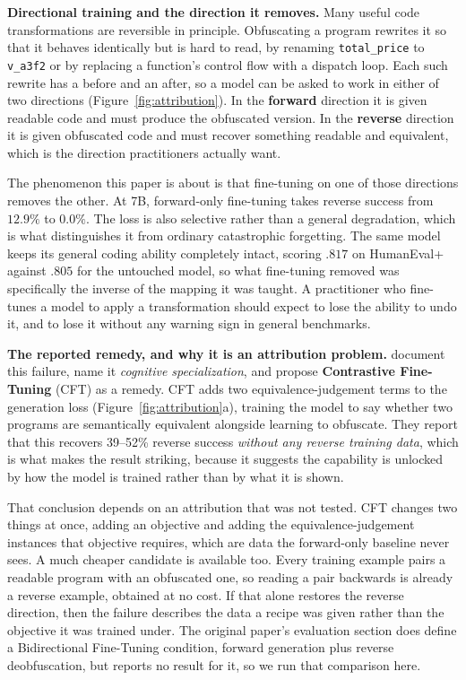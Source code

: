 \documentclass{article}
\begin{document}
\textbf{Directional training and the direction it removes.} Many useful code
transformations are reversible in principle. Obfuscating a program rewrites it so that it
behaves identically but is hard to read, by renaming \texttt{total\_price} to
\texttt{v\_a3f2} or by replacing a function's control flow with a dispatch loop. Each such
rewrite has a before and an after, so a model can be asked to work in either of two
directions (Figure~\ref{fig:attribution}). In the \textbf{forward} direction it is given
readable code and must produce the obfuscated version. In the \textbf{reverse} direction it
is given obfuscated code and must recover something readable and equivalent, which is the
direction practitioners actually want.



The phenomenon this paper is about is that fine-tuning on one of those directions removes
the other. At 7B, forward-only fine-tuning takes reverse success from $12.9\%$ to $0.0\%$.
The loss is also selective rather than a general degradation, which is what distinguishes it
from ordinary catastrophic forgetting. The same model keeps its general coding ability
completely intact, scoring $.817$ on HumanEval+ against $.805$ for the untouched model, so
what fine-tuning removed was specifically the inverse of the mapping it was taught. A
practitioner who fine-tunes a model to apply a transformation should expect to lose the
ability to undo it, and to lose it without any warning sign in general benchmarks.

\textbf{The reported remedy, and why it is an attribution problem.}
\citet{nikiema2025contrastive} document this failure, name it \emph{cognitive
specialization}, and propose \textbf{Contrastive Fine-Tuning} (CFT) as a remedy. CFT adds two
equivalence-judgement terms to the generation loss (Figure~\ref{fig:attribution}a), training
the model to say whether two programs are semantically equivalent alongside learning to
obfuscate. They report that this recovers 39--52\% reverse success \emph{without any reverse
training data}, which is what makes the result striking, because it suggests the capability is
unlocked by how the model is trained rather than by what it is shown.

That conclusion depends on an attribution that was not tested. CFT changes two things at
once, adding an objective and adding the equivalence-judgement instances that objective
requires, which are data the forward-only baseline never sees. A much cheaper candidate is
available too. Every training example pairs a readable program with an obfuscated one, so
reading a pair backwards is already a reverse example, obtained at no cost. If that alone
restores the reverse direction, then the failure describes the data a recipe was given
rather than the objective it was trained under. The original paper's evaluation section does
define a Bidirectional Fine-Tuning condition, forward generation plus reverse
deobfuscation, but reports no result for it, so we run that comparison here.
\end{document}
